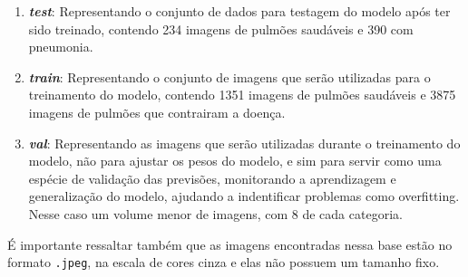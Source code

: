 \begin{enumerate}
    \item \textit{\textbf{test}}: Representando o conjunto de dados para testagem do modelo após ter sido treinado, contendo 234 imagens de pulmões saudáveis e 390 com pneumonia. 

    \item \textit{\textbf{train}}: Representando o conjunto de imagens que serão utilizadas para o treinamento do modelo, contendo 1351 imagens de pulmões saudáveis e 3875 imagens de pulmões que contrairam a doença.

    \item \textit{\textbf{val}}: Representando as imagens que serão utilizadas durante o treinamento do modelo, não para ajustar os pesos do modelo, e sim para servir como uma espécie de validação das previsões, monitorando a aprendizagem e generalização do modelo, ajudando a indentificar problemas como overfitting. Nesse caso um volume menor de imagens, com 8 de cada categoria.
    
\end{enumerate}


É importante ressaltar também que as imagens encontradas nessa base estão no formato \verb|.jpeg|, na escala de cores cinza e elas não possuem um tamanho fixo.